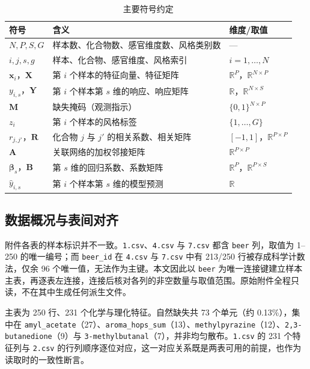 \documentclass[UTF8,a4paper,zihao=-4]{ctexart}
\numberwithin{figure}{section}
\numberwithin{table}{section}
\numberwithin{equation}{section}
\newcommand{\file}[1]{\texttt{#1}}
\newcommand{\R}{\mathbb{R}}
\newcommand{\vx}{\bm{x}}
\newcommand{\bX}{\bm{X}}
\newcommand{\bY}{\bm{Y}}
\newcommand{\bA}{\bm{A}}
\newcommand{\bR}{\bm{R}}
\newcommand{\bM}{\bm{M}}
\newcommand{\bB}{\bm{B}}
\newcommand{\bbeta}{\bm{\beta}}
\begin{document}
\begin{table}[H]
  \centering
  \caption{主要符号约定}
  \label{tab:notation}
  \small
  \begin{tabularx}{\textwidth}{@{}l X l@{}}
    \toprule
    符号 & 含义 & 维度/取值 \\
    \midrule
    $N,P,S,G$ & 样本数、化合物数、感官维度数、风格类别数 & — \\
    $i,j,s,g$ & 样本、化合物、感官维度、风格索引 & $i=1,\dots,N$ \\
    $\vx_i$，$\bX$ & 第 $i$ 个样本的特征向量、特征矩阵 & $\R^{P}$，$\R^{N\times P}$ \\
    $y_{i,s}$，$\bY$ & 第 $i$ 个样本第 $s$ 维的响应、响应矩阵 & $\R$，$\R^{N\times S}$ \\
    $\bM$ & 缺失掩码（观测指示） & $\{0,1\}^{N\times P}$ \\
    $z_i$ & 第 $i$ 个样本的风格标签 & $\{1,\dots,G\}$ \\
    $r_{j,j'}$，$\bR$ & 化合物 $j$ 与 $j'$ 的相关系数、相关矩阵 & $[-1,1]$，$\R^{P\times P}$ \\
    $\bA$ & 关联网络的加权邻接矩阵 & $\R^{P\times P}$ \\
    $\bbeta_s$，$\bB$ & 第 $s$ 维的回归系数、系数矩阵 & $\R^{P}$，$\R^{P\times S}$ \\
    $\hat y_{i,s}$ & 第 $i$ 个样本第 $s$ 维的模型预测 & $\R$ \\
    \bottomrule
  \end{tabularx}
\end{table}

\subsection{数据概况与表间对齐}

附件各表的样本标识并不一致。\file{1.csv}、\file{4.csv} 与 \file{7.csv} 都含 \file{beer} 列，取值为 1--250 的唯一编号；而 \file{beer\_id} 在 \file{4.csv} 与 \file{7.csv} 中有 213/250 行被存成科学计数法，仅余 96 个唯一值，无法作为主键。本文因此以 \file{beer} 为唯一连接键建立样本主表，再逐表左连接，连接后核对各列的非空数量与取值范围。原始附件全程只读，不在其中生成任何派生文件。

主表为 250 行、231 个化学与理化特征。自然缺失共 73 个单元（约 0.13\%），集中在 \file{amyl\_acetate}（27）、\file{aroma\_hops\_sum}（13）、\file{methylpyrazine}（12）、\file{2,3-butanedione}（9）与 \file{3-methylbutanal}（7），并非均匀散布。\file{1.csv} 的 231 个特征列与 \file{2.csv} 的行列顺序逐位对应，这一对应关系既是两表可用的前提，也作为读取时的一致性断言。
\end{document}
